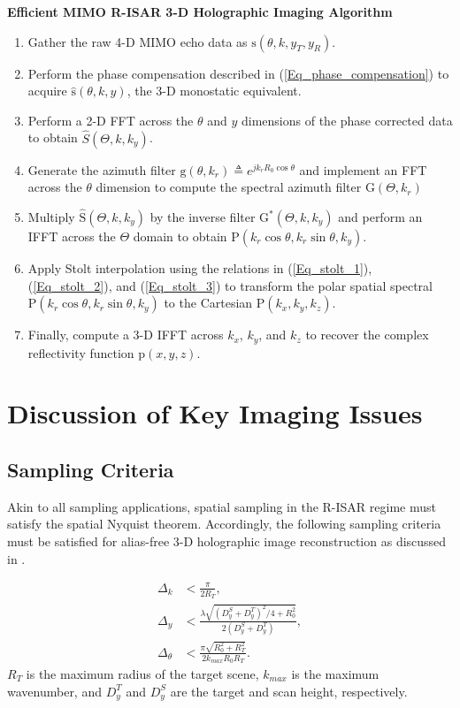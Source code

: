 \documentclass[conference]{IEEEtran}
\begin{document}
		\textbf{Efficient MIMO R-ISAR 3-D Holographic Imaging Algorithm}
		\begin{enumerate}
			\item Gather the raw 4-D MIMO echo data as $\text{s}(\theta,k,y_T,y_R)$.
			\item Perform the phase compensation described in (\ref{Eq_phase_compensation}) to acquire $\hat{\text{s}}(\theta,k,y)$, the 3-D monostatic equivalent.
			\item Perform a 2-D FFT across the $\theta$ and $y$ dimensions of the phase corrected data to obtain $\hat{S}(\Theta,k,k_y)$.
			\item Generate the azimuth filter $\text{g}(\theta,k_r) \triangleq e^{jk_rR_0\cos\theta}$ and implement an FFT across the $\theta$ dimension to compute the spectral azimuth filter $\text{G}(\Theta,k_r)$
			\item Multiply $\hat{\text{S}}(\Theta,k,k_y)$ by the inverse filter $\text{G}^*(\Theta,k,k_y)$  and perform an IFFT across the $\Theta$ domain to obtain $\text{P}(k_r\cos\theta,k_r\sin\theta,k_y)$.
			\item Apply Stolt interpolation using the relations in (\ref{Eq_stolt_1}), (\ref{Eq_stolt_2}), and (\ref{Eq_stolt_3}) to transform the polar spatial spectral $\text{P}(k_r\cos\theta,k_r\sin\theta,k_y)$ to the Cartesian $\text{P}(k_x,k_y,k_z)$.
			\item Finally, compute a 3-D IFFT across $k_x$, $k_y$, and $k_z$ to recover the complex reflectivity function $\text{p}(x,y,z)$.
		\end{enumerate}
		
		\section{Discussion of Key Imaging Issues}
		\label{sec:key_issues}
		
		\subsection{Sampling Criteria}
		Akin to all sampling applications, spatial sampling in the R-ISAR regime must satisfy the spatial Nyquist theorem. Accordingly, the following sampling criteria must be satisfied for alias-free 3-D holographic image reconstruction as discussed in \cite{Gao:EfficientAlgorithmMIMOCylindrical,Sheen:CSARPatent,Zhuge:ConcealedWeaponDectection}.
		
		\begin{align}
			\Delta_k &< \frac{\pi}{2R_T}, \\
			\Delta_y &< \frac{\lambda \sqrt{(D_y^S + D_y^T)^2 /4 + R_0^2}}{2(D_y^S + D_y^T)}, \\
			\Delta_\theta &< \frac{\pi \sqrt{R_0^2 + R_T^2}}{2k_{max}R_0R_T}.
		\end{align}
		$R_T$ is the maximum radius of the target scene, $k_{max}$ is the maximum wavenumber, and $D_y^T$ and $D_y^S$ are the target and scan height, respectively.
		
\end{document}
